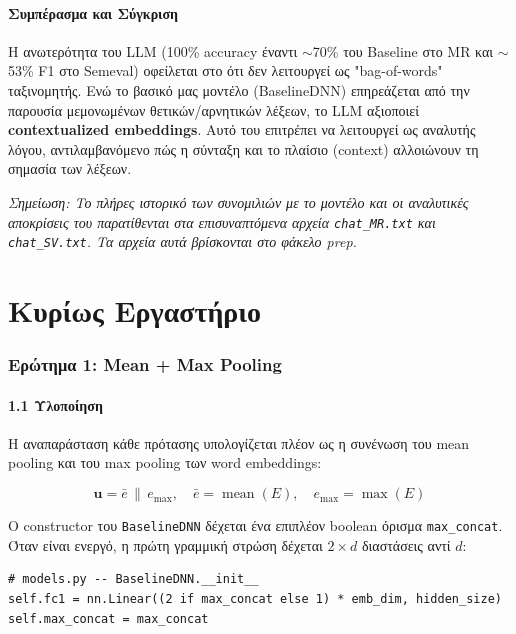 \documentclass[12pt]{article}
\begin{document}
\subsection*{Συμπέρασμα και Σύγκριση}

Η ανωτερότητα του LLM (100\% accuracy έναντι $\sim$70\% του Baseline στο MR και $\sim$53\% F1 στο Semeval) οφείλεται στο ότι δεν λειτουργεί ως "bag-of-words" ταξινομητής. Ενώ το βασικό μας μοντέλο (BaselineDNN) επηρεάζεται από την παρουσία μεμονωμένων θετικών/αρνητικών λέξεων, το LLM αξιοποιεί \textbf{contextualized embeddings}. Αυτό του επιτρέπει να λειτουργεί ως αναλυτής λόγου, αντιλαμβανόμενο πώς η σύνταξη και το πλαίσιο (context) αλλοιώνουν τη σημασία των λέξεων.

\textit{Σημείωση: Το πλήρες ιστορικό των συνομιλιών με το μοντέλο και οι αναλυτικές αποκρίσεις του παρατίθενται στα επισυναπτόμενα αρχεία \texttt{chat\_MR.txt} και \texttt{chat\_SV.txt}. Τα αρχεία αυτά βρίσκονται στο φάκελο prep.}

\newpage

\part{Κυρίως Εργαστήριο}
\setcounter{section}{0}
\setcounter{secnumdepth}{0}

\section{Ερώτημα 1: Mean + Max Pooling}

\subsection{1.1 Υλοποίηση}

Η αναπαράσταση κάθε πρότασης υπολογίζεται πλέον ως η συνένωση του
mean pooling και του max pooling των word embeddings:

\[
    \mathbf{u} = \bar{e} \,\|\, e_{\max}, \quad
    \bar{e} = \operatorname{mean}(E),\quad e_{\max} = \operatorname{max}(E)
\]

Ο constructor του \texttt{BaselineDNN} δέχεται ένα επιπλέον boolean όρισμα
\texttt{max\_concat}. Όταν είναι ενεργό, η πρώτη γραμμική στρώση δέχεται
$2 \times d$ διαστάσεις αντί $d$:

\begin{lstlisting}
# models.py -- BaselineDNN.__init__
self.fc1 = nn.Linear((2 if max_concat else 1) * emb_dim, hidden_size)
self.max_concat = max_concat
\end{lstlisting}
\end{document}

